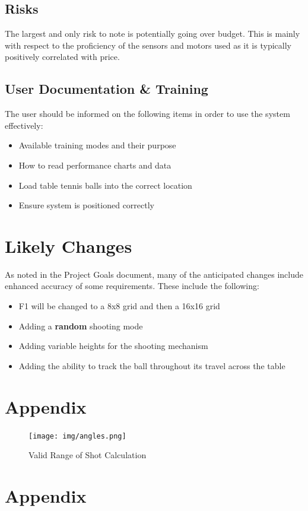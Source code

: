 \documentclass[11pt]{article}
\begin{document}
\subsection{Risks}
The largest and only risk to note is potentially going over budget. This is mainly with respect to the proficiency of the sensors and motors used as it is typically positively correlated with price. 
\subsection{User Documentation \& Training}
The user should be informed on the following items in order to use the system effectively:
\begin{itemize}
\item Available training modes and their purpose
\item How to read performance charts and data
\item Load table tennis balls into the correct location
\item Ensure system is positioned correctly
\end{itemize}
\section{Likely Changes}
As noted in the Project Goals document, many of the anticipated changes include enhanced accuracy of some requirements. These include the following:
\begin{itemize}
\item F1 will be changed to a 8x8 grid and then a 16x16 grid
\item Adding a \textbf{random} shooting mode
\item Adding variable heights for the shooting mechanism
\item Adding the ability to track the ball throughout its travel across the table
\end{itemize}
\section{Appendix}
\begin{figure}[H]
\centering
\texttt{[image: img/angles.png]}
\caption{Valid Range of Shot Calculation}
\label{fig:calc}
\end{figure}
\section{Appendix}
\end{document}
